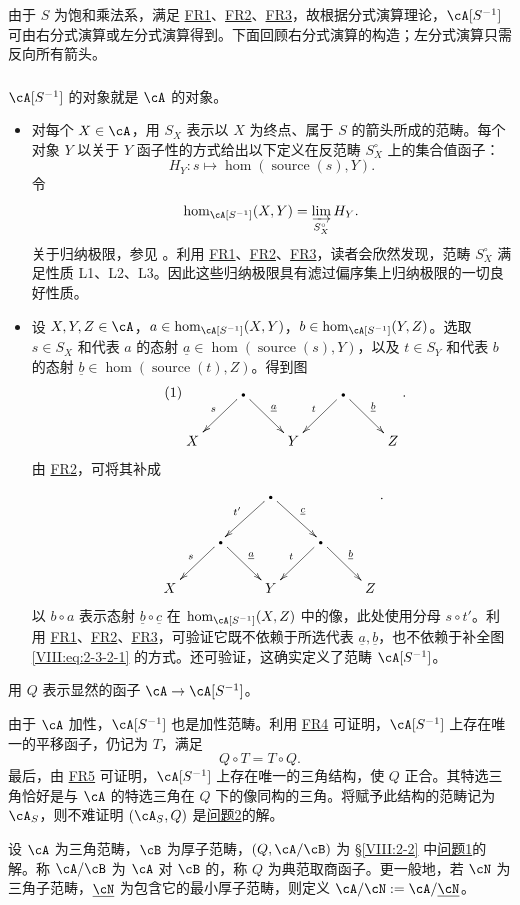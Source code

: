 由于 $S$ 为饱和乘法系，满足 \hyperlink{VIII:FR1}{FR1}、\hyperlink{VIII:FR2}{FR2}、\hyperlink{VIII:FR3}{FR3}，故根据分式演算理论，$\cA[S^{-1}]$ 可由右分式演算或左分式演算得到。下面回顾右分式演算的构造；左分式演算只需反向所有箭头。
\subsubsection{}\label{VIII:2-3-2}
$\cA[S^{-1}]$ 的对象就是 $\cA$ 的对象。
\begin{itemize}
\item 对每个 $X\in\cA$，用 $S_X$ 表示以 $X$ 为终点、属于 $S$ 的箭头所成的范畴。每个对象 $Y$ 以关于 $Y$ 函子性的方式给出以下定义在反范畴 $S_X^\circ$ 上的集合值函子：
\[H_Y:s\mapsto\hom(\operatorname{source}(s),Y).\]
令
\[\hom_{\cA[S^{-1}]}(X,Y)=\varinjlim_{S_X^\circ}H_Y.\]
关于归纳极限，参见 \cite{ar62}。利用 \hyperlink{VIII:FR1}{FR1}、\hyperlink{VIII:FR2}{FR2}、\hyperlink{VIII:FR3}{FR3}，读者会欣然发现，范畴 $S_X^\circ$ 满足性质 L1、L2、L3。因此这些归纳极限具有滤过偏序集上归纳极限的一切良好性质。
\item 设 $X,Y,Z\in\cA$，$a\in\hom_{\cA[S^{-1}]}(X,Y)$，$b\in\hom_{\cA[S^{-1}]}(Y,Z)$。选取 $s\in S_X$ 和代表 $a$ 的态射 $\underline a\in\hom(\operatorname{source}(s),Y)$，以及 $t\in S_Y$ 和代表 $b$ 的态射 $\underline b\in\hom(\operatorname{source}(t),Z)$。得到图
\begin{equation*}\tag{1}\label{VIII:eq:2-3-2-1}
\xymatrix{&\bullet\ar[dl]_-s\ar[dr]^-{\underline a}&&\bullet\ar[dl]_-t\ar[dr]^-{\underline b}\\X&&Y&&Z}.
\end{equation*}
由 \hyperlink{VIII:FR2}{FR2}，可将其补成
\[\xymatrix{&&\bullet\ar[dl]_-{t'}\ar[dr]^-{\underline c}\\&\bullet\ar[dl]_-s\ar[dr]^-{\underline a}&&\bullet\ar[dl]_-t\ar[dr]^-{\underline b}\\X&&Y&&Z}.\]
以 $b\circ a$ 表示态射 $\underline b\circ\underline c$ 在 $\hom_{\cA[S^{-1}]}(X,Z)$ 中的像，此处使用分母 $s\circ t'$。利用 \hyperlink{VIII:FR1}{FR1}、\hyperlink{VIII:FR2}{FR2}、\hyperlink{VIII:FR3}{FR3}，可验证它既不依赖于所选代表 $\underline a,\underline b$，也不依赖于补全图 \eqref{VIII:eq:2-3-2-1} 的方式。还可验证，这确实定义了范畴 $\cA[S^{-1}]$。
\end{itemize}
用 $Q$ 表示显然的函子 $\cA\to\cA[S^{-1}]$。

由于 $\cA$ 加性，$\cA[S^{-1}]$ 也是加性范畴。利用 \hyperlink{VIII:FR4}{FR4} 可证明，$\cA[S^{-1}]$ 上存在唯一的平移函子，仍记为 $T$，满足
\[Q\circ T=T\circ Q.\]
最后，由 \hyperlink{VIII:FR5}{FR5} 可证明，$\cA[S^{-1}]$ 上存在唯一的三角结构，使 $Q$ 正合。其特选三角恰好是与 $\cA$ 的特选三角在 $Q$ 下的像同构的三角。将赋予此结构的范畴记为 $\cA_S$，则不难证明 $(\cA_S,Q)$ 是\hyperlink{VIII:prob2}{问题2}的解。
\begin{definition}\label{VIII:2-3-3}
设 $\cA$ 为三角范畴，$\cB$ 为厚子范畴，$(Q,\cA/\cB)$ 为 \S\ref{VIII:2-2} 中\hyperlink{VIII:prob1}{问题1}的解。称 $\cA/\cB$ 为 $\cA$ 对 $\cB$ 的，称 $Q$ 为典范取商函子。更一般地，若 $\cN$ 为三角子范畴，$\underline\cN$ 为包含它的最小厚子范畴，则定义 $\cA/\cN:=\cA/\underline\cN$。
\end{definition}
